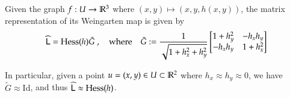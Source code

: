        	\begin{theorem}
        	Given the graph $f: U \to \mathbb{R}^3$ where $(x,y) \mapsto (x, y, h(x,y))$, the matrix
        	representation of its Weingarten map is given by
        	\begin{equation} \label{weinmatexactgraph}
        	\widehat{\mathsf{L}} = \mathrm{Hess}(h) \tilde{G} \;,\quad \mathrm{where} \quad
	        	\tilde{G} := \frac{1}{\sqrt{1+h_x^2 + h_y^2}}
	        	\begin{bmatrix}
		        	1 + h_y^2 & -h_x h_y \\
		        	-h_x h_y & 1 + h_x^2 \\
	        	\end{bmatrix} 
        	\end{equation}
        	
        	In particular, given a point $u = (x,y) \in U \subset \mathbb{R}^2$ where $h_x \approx h_y \approx 0$, we
        	have $\tilde{G} \approx \mathrm{Id}$, and thus $\widehat{\mathsf{L}} \approx \mathrm{Hess}(h)$.
        	
       	\end{theorem}
